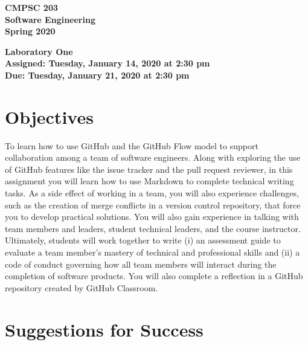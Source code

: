 \documentclass[11pt]{article}
\newcommand{\assignmentduedate}{January 21}
\newcommand{\assignmentassignedate}{January 14}
\newcommand{\assignmentnumber}{One}
\newcommand{\labyear}{2020}
\newcommand{\labdueday}{Tuesday}
\newcommand{\labassignday}{Tuesday}
\newcommand{\labtime}{2:30 pm}
\newcommand{\assigneddate}{Assigned: \labassignday, \assignmentassignedate, \labyear{} at \labtime{}}
\newcommand{\duedate}{Due: \labdueday, \assignmentduedate, \labyear{} at \labtime{}}
\newcommand{\labtitle}[1]
{
  \begin{center}
    \begin{center}
      \bf
      CMPSC 203\\Software Engineering\\
      Spring 2020\\
      \medskip
    \end{center}
    \bf
    #1
  \end{center}
}
\begin{document}
\thispagestyle{empty}

\labtitle{Laboratory \assignmentnumber{} \\ \assigneddate{} \\ \duedate{}}

\section*{Objectives}

To learn how to use GitHub and the GitHub Flow model to support collaboration
among a team of software engineers. Along with exploring the use of GitHub
features like the issue tracker and the pull request reviewer, in this
assignment you will learn how to use Markdown to complete technical writing
tasks. As a side effect of working in a team, you will also experience
challenges, such as the creation of merge conflicts in a version control
repository, that force you to develop practical solutions. You will also gain
experience in talking with team members and leaders, student technical leaders,
and the course instructor. Ultimately, students will work together to write (i)
an assessment guide to evaluate a team member's mastery of technical and
professional skills and (ii) a code of conduct governing how all team members
will interact during the completion of software products.
%
You will also complete a reflection in a GitHub repository created by GitHub
Classroom.

\section*{Suggestions for Success}
\end{document}
